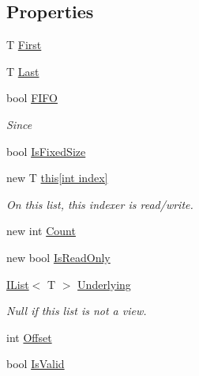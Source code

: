 \subsection*{Properties}
\begin{DoxyCompactItemize}
\item 
T \hyperlink{interface_c5_1_1_i_list_a4bf9eeadd149cdffd72702f4ab1db0ba}{First}
\item 
T \hyperlink{interface_c5_1_1_i_list_a7544fb96e486622500dc684352eac27b}{Last}
\item 
bool \hyperlink{interface_c5_1_1_i_list_a0c804cfc13feed69e308ca37a32c872d}{F\+I\+F\+O}
\begin{DoxyCompactList}\small\item\em Since \end{DoxyCompactList}\item 
bool \hyperlink{interface_c5_1_1_i_list_a265a2e21d24096940bc8c51ff7255a9b}{Is\+Fixed\+Size}
\item 
new T \hyperlink{interface_c5_1_1_i_list_a93fa9e99864a05d47bcc6a5e4bf7feb9}{this\mbox{[}int index\mbox{]}}
\begin{DoxyCompactList}\small\item\em On this list, this indexer is read/write. \end{DoxyCompactList}\item 
new int \hyperlink{interface_c5_1_1_i_list_a91519e08da04aef3233a65779f1b9942}{Count}
\item 
new bool \hyperlink{interface_c5_1_1_i_list_a413032c05b1f8f4f060afb4ab3f3b579}{Is\+Read\+Only}
\item 
\hyperlink{interface_c5_1_1_i_list}{I\+List}$<$ T $>$ \hyperlink{interface_c5_1_1_i_list_a2cdfa7ff17c18708340c56ae79f290bb}{Underlying}
\begin{DoxyCompactList}\small\item\em Null if this list is not a view. \end{DoxyCompactList}\item 
int \hyperlink{interface_c5_1_1_i_list_a018e889717be028a6190964c98e10c63}{Offset}
\item 
bool \hyperlink{interface_c5_1_1_i_list_ade26b03c600c09845c51fa9c36b24f15}{Is\+Valid}
\end{DoxyCompactItemize}
